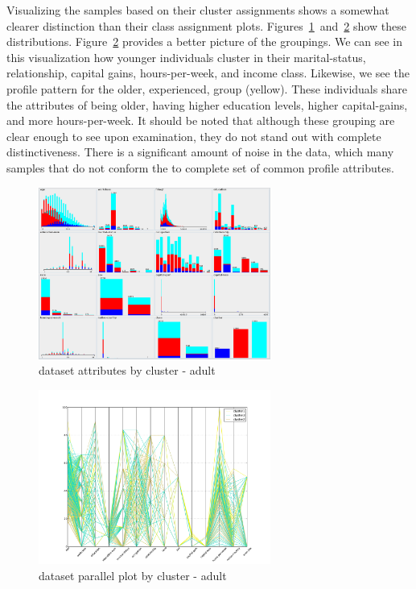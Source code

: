 \documentclass{sig-alternate}
\begin{document}
Visualizing the samples based on their cluster assignments shows a somewhat clearer distinction than their class assignment plots. Figures~\ref{adult-attr-cluster}~and~\ref{adult-parallel-cluster} show these distributions. Figure~\ref{adult-parallel-cluster} provides a better picture of the groupings. We can see in this visualization how younger individuals cluster in their marital-status, relationship, capital gains, hours-per-week, and income class. Likewise, we see the profile pattern for the older, experienced, group (yellow). These individuals share the attributes of being older, having higher education levels, higher capital-gains, and more hours-per-week. It should be noted that although these grouping are clear enough to see upon examination, they do not stand out with complete distinctiveness. There is a significant amount of noise in the data, which many samples that do not conform the to complete set of common profile attributes.

\begin{figure}[!htbp]
    \centering
    \includegraphics[width=3in]{part2/adult/attr-cluster.pdf}
    \caption{dataset attributes by cluster - adult\label{adult-attr-cluster}}
\end{figure} 

\begin{figure}[!htbp]
    \centering
    \includegraphics[width=3in]{part2/adult/parallel-cluster.pdf}
    \caption{dataset parallel plot by cluster - adult\label{adult-parallel-cluster}}
\end{figure} 
\end{document}
